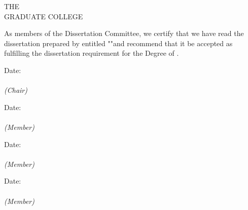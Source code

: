 \documentclass[
12pt, %
english, %
doublespacing, %
nolistspacing, %
liststotoc, %
headsepline, %
chapterinoneline, %
openany, %
]{DoctoralThesis}\usepackage[]{graphicx}\usepackage[]{color}
\begin{document}
\begin{singlespacing} %
\begin{center}

THE \MakeUppercase{\univname} \\
GRADUATE COLLEGE
\end{center}

\vspace*{0.3in}

\noindent As members of the Dissertation Committee, we certify that we have read the dissertation prepared by \authorname \space entitled "\ttitle "\space and recommend that it be accepted as fulfilling the dissertation requirement for the Degree of \degreename.

\vspace*{0.3in}

\noindent\underline{\makebox[4.0in][r]{}} \hspace{0.4in} Date:  \\
{\bfseries\chairname}\\
\emph{(Chair)}
\vspace*{0.3in}

\noindent\underline{\makebox[4.0in][r]{}} \hspace{0.4in} Date:  \\
{\bfseries\facnameA}\\
\emph{(Member)}
\vspace*{0.3in}

\noindent\underline{\makebox[4.0in][r]{}} \hspace{0.4in} Date:  \\
{\bfseries\facnameB}\\
\emph{(Member)}
\vspace*{0.3in}

\noindent\underline{\makebox[4.0in][r]{}} \hspace{0.4in} Date:  \\
{\bfseries\facnameC}\\
\emph{(Member)}
\vspace*{0.5in}



\end{singlespacing}
\end{document}
